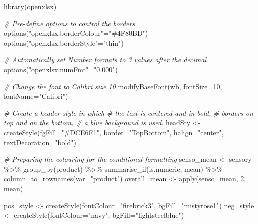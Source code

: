 \documentclass[
]{book}
\newenvironment{Shaded}{\begin{snugshade}}{\end{snugshade}}
\newcommand{\AttributeTok}[1]{\textcolor[rgb]{0.77,0.63,0.00}{#1}}
\newcommand{\CommentTok}[1]{\textcolor[rgb]{0.56,0.35,0.01}{\textit{#1}}}
\newcommand{\DecValTok}[1]{\textcolor[rgb]{0.00,0.00,0.81}{#1}}
\newcommand{\FunctionTok}[1]{\textcolor[rgb]{0.00,0.00,0.00}{#1}}
\newcommand{\NormalTok}[1]{#1}
\newcommand{\OtherTok}[1]{\textcolor[rgb]{0.56,0.35,0.01}{#1}}
\newcommand{\SpecialCharTok}[1]{\textcolor[rgb]{0.00,0.00,0.00}{#1}}
\newcommand{\StringTok}[1]{\textcolor[rgb]{0.31,0.60,0.02}{#1}}
\begin{document}
\begin{Shaded}
\begin{Highlighting}[]
\FunctionTok{library}\NormalTok{(openxlsx)}

\CommentTok{\# Pre{-}define options to control the borders }
\FunctionTok{options}\NormalTok{(}\StringTok{"openxlsx.borderColour"}\OtherTok{=}\StringTok{"\#4F80BD"}\NormalTok{)}
\FunctionTok{options}\NormalTok{(}\StringTok{"openxlsx.borderStyle"}\OtherTok{=}\StringTok{"thin"}\NormalTok{)}

\CommentTok{\# Automatically set Number formats to 3 values after the decimal}
\FunctionTok{options}\NormalTok{(}\StringTok{"openxlsx.numFmt"}\OtherTok{=}\StringTok{"0.000"}\NormalTok{)}

\CommentTok{\# Change the font to Calibri size 10}
\FunctionTok{modifyBaseFont}\NormalTok{(wb, }\AttributeTok{fontSize=}\DecValTok{10}\NormalTok{, }\AttributeTok{fontName=}\StringTok{"Calibri"}\NormalTok{)}

\CommentTok{\# Create a header style in which }
  \CommentTok{\# the text is centered and in bold, }
  \CommentTok{\# borders on top and on the bottom, }
  \CommentTok{\# a blue background is used.}
\NormalTok{headSty }\OtherTok{\textless{}{-}} \FunctionTok{createStyle}\NormalTok{(}\AttributeTok{fgFill=}\StringTok{"\#DCE6F1"}\NormalTok{, }\AttributeTok{border=}\StringTok{"TopBottom"}\NormalTok{,}
                       \AttributeTok{halign=}\StringTok{"center"}\NormalTok{, }\AttributeTok{textDecoration=}\StringTok{"bold"}\NormalTok{)}

\CommentTok{\# Preparing the colouring for the conditional formatting}
\NormalTok{senso\_mean }\OtherTok{\textless{}{-}}\NormalTok{ sensory }\SpecialCharTok{\%\textgreater{}\%} 
  \FunctionTok{group\_by}\NormalTok{(product) }\SpecialCharTok{\%\textgreater{}\%} 
  \FunctionTok{summarise\_if}\NormalTok{(is.numeric, mean) }\SpecialCharTok{\%\textgreater{}\%} 
  \FunctionTok{column\_to\_rownames}\NormalTok{(}\AttributeTok{var=}\StringTok{"product"}\NormalTok{)}
\NormalTok{overall\_mean }\OtherTok{\textless{}{-}} \FunctionTok{apply}\NormalTok{(senso\_mean, }\DecValTok{2}\NormalTok{, mean)}

\NormalTok{pos\_style }\OtherTok{\textless{}{-}} \FunctionTok{createStyle}\NormalTok{(}\AttributeTok{fontColour=}\StringTok{"firebrick3"}\NormalTok{, }\AttributeTok{bgFill=}\StringTok{"mistyrose1"}\NormalTok{)}
\NormalTok{neg\_style }\OtherTok{\textless{}{-}} \FunctionTok{createStyle}\NormalTok{(}\AttributeTok{fontColour=}\StringTok{"navy"}\NormalTok{, }\AttributeTok{bgFill=}\StringTok{"lightsteelblue"}\NormalTok{)}


\end{Highlighting}
\end{Shaded}
\end{document}
